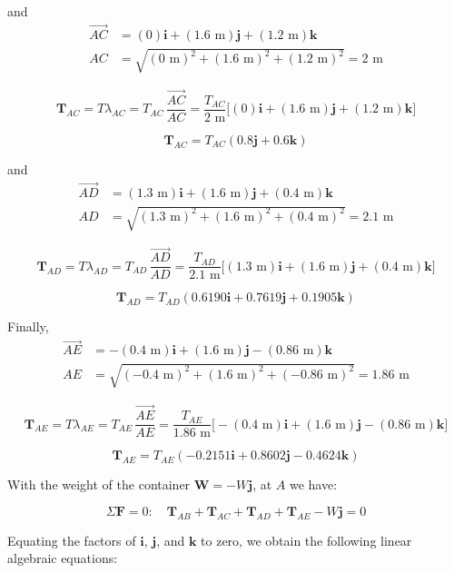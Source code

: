 \documentclass[12pt,a3paper]{article}
\begin{document}
\begin{enumerate}
\begin{tcolorbox}[enhanced,breakable,ansbox,colback=cD!4,colframe=cD,
  boxrule=0.8pt,arc=5pt,
  title={\textbf{Solution}},fonttitle=\bfseries\color{white},
  colbacktitle=cD]
\medskip
and
\begin{align*}
  \overrightarrow{AC} &= (0)\mathbf{i} + (1.6\text{ m})\mathbf{j}
    + (1.2\text{ m})\mathbf{k}\\
  AC &= \sqrt{(0\text{ m})^2 + (1.6\text{ m})^2 + (1.2\text{ m})^2}
    = 2\text{ m}
\end{align*}

\[
  \mathbf{T}_{AC} = T\lambda_{AC} = T_{AC}\,\frac{\overrightarrow{AC}}{AC}
  = \frac{T_{AC}}{2\text{ m}}
    \bigl[(0)\mathbf{i}+(1.6\text{ m})\mathbf{j}+(1.2\text{ m})\mathbf{k}\bigr]
\]

\[
  \mathbf{T}_{AC} = T_{AC}(0.8\mathbf{j} + 0.6\mathbf{k})
\]

\medskip
and
\begin{align*}
  \overrightarrow{AD} &= (1.3\text{ m})\mathbf{i}
    + (1.6\text{ m})\mathbf{j} + (0.4\text{ m})\mathbf{k}\\
  AD &= \sqrt{(1.3\text{ m})^2 + (1.6\text{ m})^2 + (0.4\text{ m})^2}
    = 2.1\text{ m}
\end{align*}

\[
  \mathbf{T}_{AD} = T\lambda_{AD} = T_{AD}\,\frac{\overrightarrow{AD}}{AD}
  = \frac{T_{AD}}{2.1\text{ m}}
    \bigl[(1.3\text{ m})\mathbf{i}+(1.6\text{ m})\mathbf{j}+(0.4\text{ m})\mathbf{k}\bigr]
\]

\[
  \mathbf{T}_{AD} = T_{AD}(0.6190\mathbf{i} + 0.7619\mathbf{j} + 0.1905\mathbf{k})
\]

\medskip
Finally,
\begin{align*}
  \overrightarrow{AE} &= -(0.4\text{ m})\mathbf{i}
    + (1.6\text{ m})\mathbf{j} - (0.86\text{ m})\mathbf{k}\\
  AE &= \sqrt{(-0.4\text{ m})^2 + (1.6\text{ m})^2 + (-0.86\text{ m})^2}
    = 1.86\text{ m}
\end{align*}

\[
  \mathbf{T}_{AE} = T\lambda_{AE} = T_{AE}\,\frac{\overrightarrow{AE}}{AE}
  = \frac{T_{AE}}{1.86\text{ m}}
    \bigl[-(0.4\text{ m})\mathbf{i}+(1.6\text{ m})\mathbf{j}-(0.86\text{ m})\mathbf{k}\bigr]
\]

\[
  \mathbf{T}_{AE} = T_{AE}(-0.2151\mathbf{i} + 0.8602\mathbf{j} - 0.4624\mathbf{k})
\]

\medskip
With the weight of the container $\mathbf{W} = -W\mathbf{j}$, at $A$ we have:

\[
  \Sigma\mathbf{F} = 0{:}\quad
  \mathbf{T}_{AB} + \mathbf{T}_{AC} + \mathbf{T}_{AD} +\mathbf{T}_{AE} - W\mathbf{j} = 0
\]

Equating the factors of $\mathbf{i}$, $\mathbf{j}$, and $\mathbf{k}$ to zero,
we obtain the following linear algebraic equations:


\end{tcolorbox}
\end{enumerate}
\end{document}

